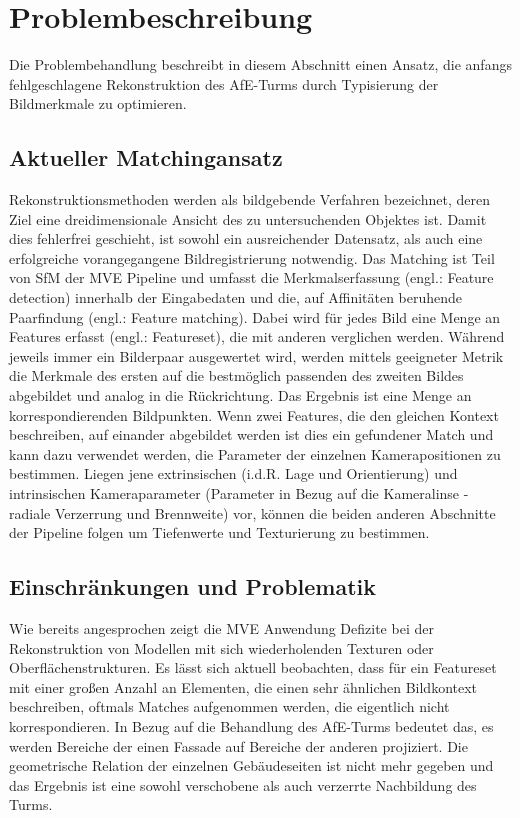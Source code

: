 \chapter{Problembeschreibung}
Die Problembehandlung beschreibt in diesem Abschnitt einen Ansatz, die anfangs fehlgeschlagene Rekonstruktion des AfE-Turms durch Typisierung der Bildmerkmale zu optimieren. 

\section{Aktueller Matchingansatz}
Rekonstruktionsmethoden werden als bildgebende Verfahren bezeichnet, deren Ziel eine dreidimensionale Ansicht des zu untersuchenden Objektes ist. Damit dies fehlerfrei geschieht, ist sowohl ein ausreichender Datensatz, als auch eine erfolgreiche vorangegangene Bildregistrierung notwendig. Das Matching ist Teil von SfM der MVE Pipeline und umfasst die Merkmalserfassung (engl.: Feature detection) innerhalb der Eingabedaten und die, auf Affinit\"aten beruhende Paarfindung (engl.: Feature matching). Dabei wird f\"ur jedes Bild eine Menge an Features erfasst (engl.: Featureset), die mit anderen verglichen werden. W\"ahrend jeweils immer ein Bilderpaar ausgewertet wird, werden mittels geeigneter Metrik die Merkmale des ersten auf die bestm\"oglich passenden des zweiten Bildes abgebildet und analog in die R\"uckrichtung. Das Ergebnis ist eine Menge an korrespondierenden Bildpunkten. Wenn zwei Features, die den gleichen Kontext beschreiben, auf einander abgebildet werden ist dies ein gefundener Match und kann dazu verwendet werden, die Parameter der einzelnen Kamerapositionen zu bestimmen. 
Liegen jene extrinsischen (i.d.R. Lage und Orientierung) und intrinsischen Kameraparameter (Parameter in Bezug auf die Kameralinse - radiale Verzerrung und Brennweite) vor, k\"onnen die beiden anderen Abschnitte der Pipeline folgen um Tiefenwerte und Texturierung zu bestimmen.

\section{Einschr\"ankungen und Problematik}
Wie bereits angesprochen zeigt die MVE Anwendung Defizite bei der Rekonstruktion von Modellen mit sich wiederholenden Texturen oder Oberfl\"achenstrukturen. Es l\"asst sich aktuell beobachten, dass f\"ur ein Featureset mit einer gro\ss en Anzahl an Elementen, die einen sehr \"ahnlichen Bildkontext beschreiben, oftmals Matches aufgenommen werden, die eigentlich nicht korrespondieren. In Bezug auf die Behandlung des AfE-Turms bedeutet das, es werden Bereiche der einen Fassade auf Bereiche der anderen projiziert. Die geometrische Relation der einzelnen Geb\"audeseiten ist nicht mehr gegeben und das Ergebnis ist eine sowohl verschobene als auch verzerrte Nachbildung des Turms.

